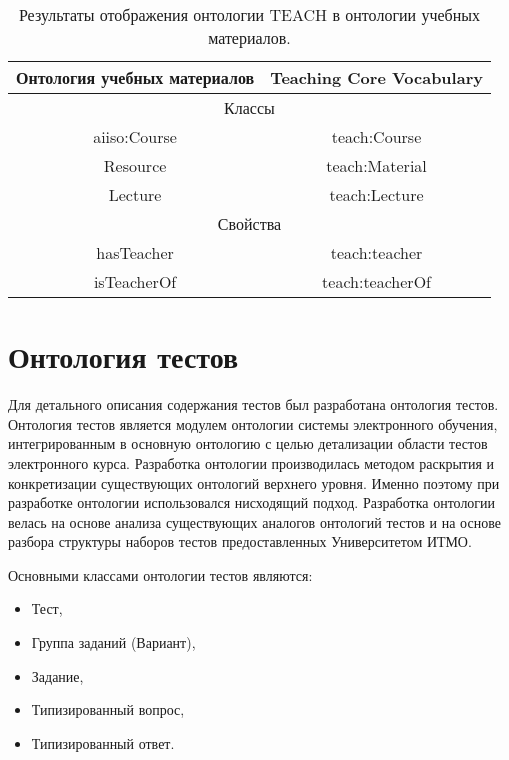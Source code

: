 \begin{table}[ht]
\centering
\caption{Результаты отображения онтологии TEACH в онтологии учебных материалов.}
\label{table:teach_mapping}
\setlength{\tabcolsep}{10pt} 
\renewcommand{\arraystretch}{1.5} 
\begin{tabular}{ |c|c|  }
\hline Онтология учебных материалов  &  Teaching Core Vocabulary  \\
\hline \hline \multicolumn{2}{|c|}{Классы} \\ 
\hline aiiso:Course & teach:Course \\
\hline Resource & teach:Material \\
\hline Lecture & teach:Lecture \\
\hline \hline \multicolumn{2}{|c|}{Свойства} \\ 
\hline hasTeacher & teach:teacher \\
\hline isTeacherOf & teach:teacherOf \\
\hline
\end{tabular}
\end{table}



\section{Онтология тестов} \label{sect2_3}

Для детального описания содержания тестов был разработана онтология тестов. Онтология тестов является модулем онтологии системы электронного обучения, интегрированным в основную онтологию с целью детализации области тестов электронного курса. Разработка онтологии производилась методом раскрытия и конкретизации существующих онтологий верхнего уровня. Именно поэтому при разработке онтологии использовался нисходящий подход. Разработка онтологии велась на основе анализа существующих аналогов онтологий тестов и на основе разбора структуры наборов тестов предоставленных Университетом ИТМО.

Основными классами онтологии тестов являются:

\begin{itemize}
\item Тест,
\item Группа заданий (Вариант),
\item Задание,
\item Типизированный вопрос,
\item Типизированный ответ.
\end{itemize}

